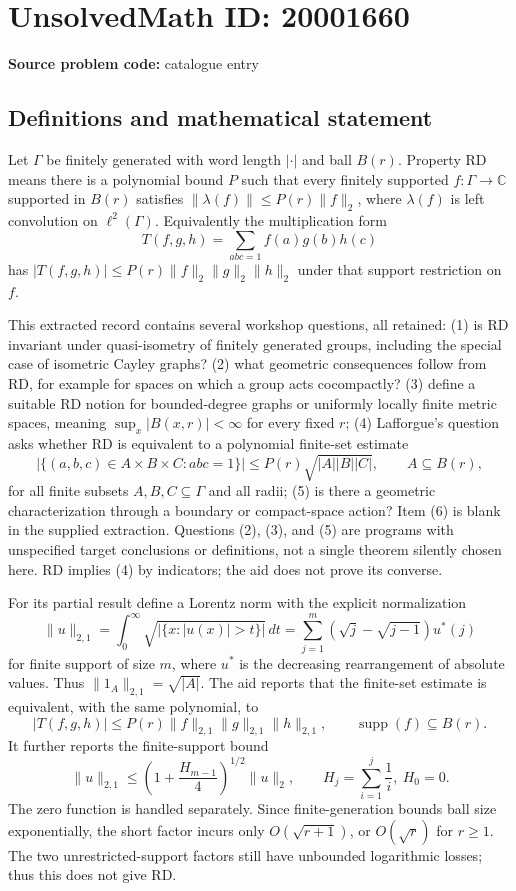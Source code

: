 \documentclass[11pt]{article}
\newcommand{\C}{\mathbb{C}}
\begin{document}
\section*{UnsolvedMath ID: 20001660}
\textbf{Source problem code:} catalogue entry
\subsection{Definitions and mathematical statement}
Let \(\Gamma\) be finitely generated with word length \(|\cdot|\) and ball \(B(r)\). Property RD means there is a polynomial bound \(P\) such that every finitely supported \(f:\Gamma\to\C\) supported in \(B(r)\) satisfies \(\|\lambda(f)\|\le P(r)\|f\|_2\), where \(\lambda(f)\) is left convolution on \(\ell^2(\Gamma)\). Equivalently the multiplication form
\[
 T(f,g,h)=\sum_{abc=1}f(a)g(b)h(c)
\]
has \(|T(f,g,h)|\le P(r)\|f\|_2\|g\|_2\|h\|_2\) under that support restriction on \(f\).

This extracted record contains several workshop questions, all retained: (1) is RD invariant under quasi-isometry of finitely generated groups, including the special case of isometric Cayley graphs? (2) what geometric consequences follow from RD, for example for spaces on which a group acts cocompactly? (3) define a suitable RD notion for bounded-degree graphs or uniformly locally finite metric spaces, meaning \(\sup_x|B(x,r)|<\infty\) for every fixed \(r\); (4) Lafforgue's question asks whether RD is equivalent to a polynomial finite-set estimate
\[
 |\{(a,b,c)\in A\times B\times C:abc=1\}|
 \le P(r)\sqrt{|A||B||C|},\qquad A\subseteq B(r),
\]
for all finite subsets \(A,B,C\subseteq\Gamma\) and all radii; (5) is there a geometric characterization through a boundary or compact-space action? Item (6) is blank in the supplied extraction. Questions (2), (3), and (5) are programs with unspecified target conclusions or definitions, not a single theorem silently chosen here. RD implies (4) by indicators; the aid does not prove its converse.

For its partial result define a Lorentz norm with the explicit normalization
\[
 \|u\|_{2,1}=\int_0^\infty
       \sqrt{|\{x:|u(x)|>t\}|}\,dt
 =\sum_{j=1}^{m}(\sqrt j-\sqrt{j-1})u^*(j)
\]
for finite support of size \(m\), where \(u^*\) is the decreasing rearrangement of absolute values. Thus \(\|1_A\|_{2,1}=\sqrt{|A|}\). The aid reports that the finite-set estimate is equivalent, with the same polynomial, to
\[
 |T(f,g,h)|\le P(r)\|f\|_{2,1}\|g\|_{2,1}\|h\|_{2,1},
 \qquad\operatorname{supp}(f)\subseteq B(r).
\]
It further reports the finite-support bound
\[
 \|u\|_{2,1}\le\left(1+\frac{H_{m-1}}4\right)^{1/2}\|u\|_2,
 \qquad H_j=\sum_{i=1}^j\frac1i,\ H_0=0.
\]
The zero function is handled separately. Since finite-generation bounds ball size exponentially, the short factor incurs only \(O(\sqrt{r+1})\), or \(O(\sqrt r)\) for \(r\ge1\). The two unrestricted-support factors still have unbounded logarithmic losses; thus this does not give RD.
\end{document}
